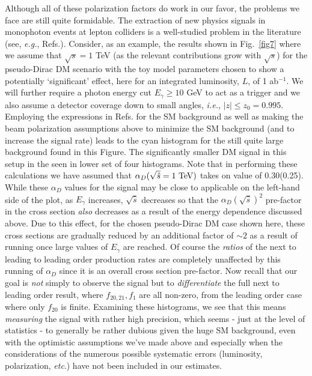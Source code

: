 \documentclass[14pt]{article}
\def\ie{{\it i.e.}}
\def\eg{{\it e.g.}}
\def\etc{{\it etc}}
\begin{document}
{Although all of these polarization factors do work in our favor, the problems we face are still quite formidable. The extraction of new physics signals in monophoton events at lepton colliders is a well-studied 
problem in the literature (see, \eg, Refs.\cite{Chae:2012bq,Kalinowski:2021tyr,Khalil:2021afa,Black:2022qlg,Dreiner:2012xm,Bauer:2023loq}).  Consider, as an example, the results shown 
in Fig.~\ref{fig7} where we assume that $\sqrt s=1$ TeV (as the relevant contributions grow with $\sqrt s$) for the pseudo-Dirac DM scenario with the toy model parameters chosen to show a 
potentially `significant' 
effect, here for an integrated luminosity, $L$, of 1 ab$^{-1}$. We will further require a photon energy cut $E_\gamma \geq 10$ GeV to act as a trigger and we also assume a 
detector coverage down to small angles, \ie, $|z|\leq z_0=0.995$. Employing the expressions in Refs.\cite{Hirsch:2002uv,Barranco:2007ej,Berezhiani:2001rs,Escrihuela:2019mot} for the SM 
background as well as making the beam polarization assumptions above to minimize the SM background (and to increase the signal rate) leads to the cyan histogram for the still quite large 
background found in this Figure. The significantly smaller DM signal in this setup in the seen in lower set of four histograms. Note that in performing these calculations we have assumed that 
$\alpha_D({\sqrt {\hat s}=\rm 1~ TeV})$ takes on value of 0.30(0.25). While these $\alpha_D$ values for the signal may be close to applicable on the left-hand side of the plot, as $E_\gamma$ increases, 
${\sqrt {\hat s}}$ decreases so that the $\alpha_D(\sqrt {\hat s})^2$ pre-factor in the cross section {\it also} decreases as a result of the energy dependence discussed above. Due to this effect, for the 
chosen pseudo-Dirac DM case shown here, these cross sections are gradually reduced by an additional factor of $\sim 2$ as a result of running once large values of $E_\gamma$ are reached.  
Of course the {\it ratios} of the next to leading to leading order production rates are completely unaffected by this running of $\alpha_D$ since it is an overall cross section pre-factor. Now recall that 
our goal is {\it not} simply to observe the signal but to {\it differentiate} the full next to leading order result, where $f_{20,21},f_1$ are
all non-zero, from the leading order case where only $f_{20}$ is finite. Examining these histograms, we see that this means {\it measuring} the signal with rather high precision, which  
seems - just at the level of statistics - to generally be rather dubious given the huge SM background, even with the optimistic assumptions we've made above and especially when the considerations of the 
numerous possible systematic errors (luminosity, polarization, \etc.) have not been included in our estimates.

}
\end{document}
